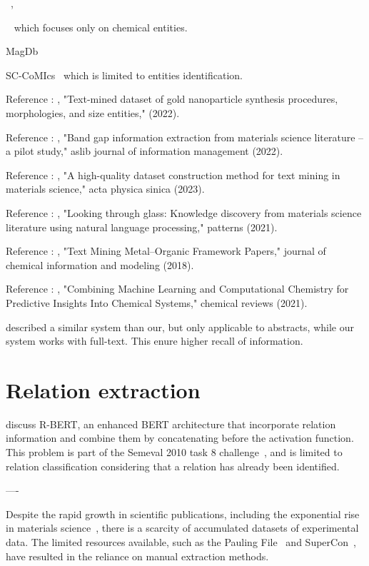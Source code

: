 \documentclass[12pt, a4paper]{report}
\begin{document}
~\cite{kononova_text-mined_2019}, 

~\cite{court2018auto} which focuses only on chemical entities. 

MagDb~\cite{court_magnetic_2020}

SC-CoMIcs~\cite{yamaguchi-etal-2020-sc} which is limited to entities identification.

Reference \cite{cruse2022text}: , "Text-mined dataset of gold nanoparticle synthesis procedures, morphologies, and size entities,"  (2022).

Reference \cite{band2022ghosh}: , "Band gap information extraction from materials science literature – a pilot study," aslib journal of information management (2022).

Reference \cite{yue2023ahigh}: , "A high-quality dataset construction method for text mining in materials science," acta physica sinica (2023). 

Reference \cite{venugopal2021looking}: , "Looking through glass: Knowledge discovery from materials science literature using natural language processing," patterns (2021). 

Reference \cite{park2018text}: , "Text Mining Metal–Organic Framework Papers," journal of chemical information and modeling (2018).

Reference \cite{keith2021combining}: , "Combining Machine Learning and Computational Chemistry for Predictive Insights Into Chemical Systems," chemical reviews (2021). 


\cite{mitsui2023automatic} described a similar system than our, but only applicable to abstracts, while our system works with full-text. This enure higher recall of information. 



\section{Relation extraction}

\cite{wu2019enriching} discuss R-BERT, an enhanced BERT architecture that incorporate relation information and combine them by concatenating before the activation function. 
This problem is part of the Semeval 2010 task 8 challenge~\cite{hendrickx2019semeval}, and is limited to relation classification considering that a relation has already been identified.



----

Despite the rapid growth in scientific publications, including the exponential rise in materials science~\cite{Pratheepan_2019}, there is a scarcity of accumulated datasets of experimental data. 
The limited resources available, such as the Pauling File~\cite{Blokhin2018ThePF_paulingFile} and SuperCon~\cite{SuperCon}, have resulted in the reliance on manual extraction methods.
\end{document}
